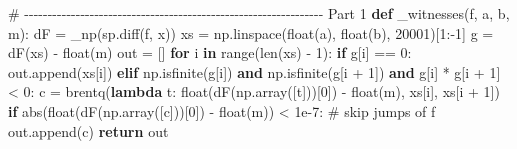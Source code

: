 \documentclass[
  letterpaper,
  DIV=11,
  numbers=noendperiod]{scrreprt}
\newenvironment{Shaded}{\begin{snugshade}}{\end{snugshade}}
\newcommand{\BuiltInTok}[1]{\textcolor[rgb]{0.00,0.23,0.31}{#1}}
\newcommand{\CommentTok}[1]{\textcolor[rgb]{0.37,0.37,0.37}{#1}}
\newcommand{\ControlFlowTok}[1]{\textcolor[rgb]{0.00,0.23,0.31}{\textbf{#1}}}
\newcommand{\DecValTok}[1]{\textcolor[rgb]{0.68,0.00,0.00}{#1}}
\newcommand{\FloatTok}[1]{\textcolor[rgb]{0.68,0.00,0.00}{#1}}
\newcommand{\KeywordTok}[1]{\textcolor[rgb]{0.00,0.23,0.31}{\textbf{#1}}}
\newcommand{\NormalTok}[1]{\textcolor[rgb]{0.00,0.23,0.31}{#1}}
\newcommand{\OperatorTok}[1]{\textcolor[rgb]{0.37,0.37,0.37}{#1}}
\theoremstyle{plain}
\theoremstyle{plain}
\theoremstyle{definition}
\theoremstyle{definition}
\theoremstyle{definition}
\theoremstyle{plain}
\theoremstyle{plain}
\theoremstyle{remark}
\begin{document}
\begin{Shaded}
\begin{Highlighting}[]
\CommentTok{\# {-}{-}{-}{-}{-}{-}{-}{-}{-}{-}{-}{-}{-}{-}{-}{-}{-}{-}{-}{-}{-}{-}{-}{-}{-}{-}{-}{-}{-}{-}{-}{-}{-}{-}{-}{-}{-}{-}{-}{-}{-}{-}{-}{-}{-}{-}{-}{-}{-}{-}{-}{-}{-}{-}{-}{-}{-}{-}{-}{-}{-}{-}{-}{-} Part 1}
\KeywordTok{def}\NormalTok{ \_witnesses(f, a, b, m):}
\NormalTok{    dF }\OperatorTok{=}\NormalTok{ \_np(sp.diff(f, x))}
\NormalTok{    xs }\OperatorTok{=}\NormalTok{ np.linspace(}\BuiltInTok{float}\NormalTok{(a), }\BuiltInTok{float}\NormalTok{(b), }\DecValTok{20001}\NormalTok{)[}\DecValTok{1}\NormalTok{:}\OperatorTok{{-}}\DecValTok{1}\NormalTok{]}
\NormalTok{    g }\OperatorTok{=}\NormalTok{ dF(xs) }\OperatorTok{{-}} \BuiltInTok{float}\NormalTok{(m)}
\NormalTok{    out }\OperatorTok{=}\NormalTok{ []}
    \ControlFlowTok{for}\NormalTok{ i }\KeywordTok{in} \BuiltInTok{range}\NormalTok{(}\BuiltInTok{len}\NormalTok{(xs) }\OperatorTok{{-}} \DecValTok{1}\NormalTok{):}
        \ControlFlowTok{if}\NormalTok{ g[i] }\OperatorTok{==} \DecValTok{0}\NormalTok{:}
\NormalTok{            out.append(xs[i])}
        \ControlFlowTok{elif}\NormalTok{ np.isfinite(g[i]) }\KeywordTok{and}\NormalTok{ np.isfinite(g[i }\OperatorTok{+} \DecValTok{1}\NormalTok{]) }\KeywordTok{and}\NormalTok{ g[i] }\OperatorTok{*}\NormalTok{ g[i }\OperatorTok{+} \DecValTok{1}\NormalTok{] }\OperatorTok{\textless{}} \DecValTok{0}\NormalTok{:}
\NormalTok{            c }\OperatorTok{=}\NormalTok{ brentq(}\KeywordTok{lambda}\NormalTok{ t: }\BuiltInTok{float}\NormalTok{(dF(np.array([t]))[}\DecValTok{0}\NormalTok{]) }\OperatorTok{{-}} \BuiltInTok{float}\NormalTok{(m), xs[i], xs[i }\OperatorTok{+} \DecValTok{1}\NormalTok{])}
            \ControlFlowTok{if} \BuiltInTok{abs}\NormalTok{(}\BuiltInTok{float}\NormalTok{(dF(np.array([c]))[}\DecValTok{0}\NormalTok{]) }\OperatorTok{{-}} \BuiltInTok{float}\NormalTok{(m)) }\OperatorTok{\textless{}} \FloatTok{1e{-}7}\NormalTok{:   }\CommentTok{\# skip jumps of f\textquotesingle{}}
\NormalTok{                out.append(c)}
    \ControlFlowTok{return}\NormalTok{ out}



\end{Highlighting}
\end{Shaded}
\end{document}
